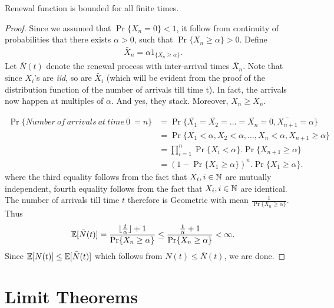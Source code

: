 \documentclass[a4paper,10pt, english]{article}
\begin{document}
\begin{prop} Renewal function is bounded for all finite times.
\end{prop}
\begin{proof}
	Since we assumed that $\Pr\{X_n = 0\} < 1$, it follow from continuity of probabilities that there exists $\alpha > 0$, such that $\Pr\{X_n \geq \alpha\} >0$. Define
	\begin{align*}
	\bar{X}_n = \alpha 1_{\{X_n \geq \alpha\}}.
	\end{align*}
	Let $\bar{N}(t)$ denote the renewal process with inter-arrival times $\bar{X}_n$. Note that since $X_i$'s are \emph{iid}, so are $\bar{X}_i$ (which will be evident from the proof of the distribution function of the number of arrivals till time t). In fact, the arrivals now happen at multiples of $\alpha$. And yes, they stack. Moreover, $X_n \geq \bar{X}_n$.
	
	\begin{align*}
	\Pr\{Number ~of ~arrivals ~at ~time ~0 ~= n\} &= \Pr\{\bar{X_1}=\bar{X_2}=\ldots=\bar{X_n}=0,\bar{X_{n+1}}=\alpha\} \\
	&= \Pr\{X_1 < \alpha,X_2 < \alpha,\ldots,X_n < \alpha,X_{n+1} \geq \alpha\} \\
	&= \prod_{i=1}^{n} \Pr\{X_i < \alpha\} . \Pr\{X_{n+1} \geq \alpha \}  \\
	&= \left(1- \Pr\{X_1 \geq \alpha \}\right) ^{n} . \Pr\{X_1 \geq \alpha\}.
	\end{align*}
	where the third equality follows from the fact that $ X_i, i \in \mathbb{N}$ are mutually independent, fourth equality follows from the fact that $ X_i, i \in \mathbb{N}$ are identical.
	\\
	The number of arrivals till time $t$ therefore is Geometric with mean $\frac{1}{\Pr\{X_n \geq \alpha\}}$. Thus 
	\begin{align*}
	\mathbb{E}[\bar{N}(t)] = \frac{\lfloor\frac{t}{\alpha} \rfloor + 1}{\Pr\{X_n \geq \alpha\}} \leq \frac{\frac{t}{\alpha} + 1}{\Pr\{X_n \geq \alpha\}} < \infty.
	\end{align*}
	Since $\mathbb{E}[N(t)] \leq \mathbb{E}[\bar{N}(t)]$ which follows from $N(t) \leq \bar{N}(t)$, we are done.
\end{proof} 

\section{Limit Theorems}
\end{document}
